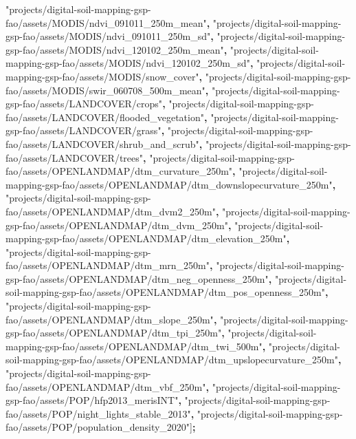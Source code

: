\documentclass[
  10pt,
  b5paper,
  oneside]{book}
\newenvironment{Shaded}{\begin{snugshade}}{\end{snugshade}}
\newcommand{\NormalTok}[1]{#1}
\newcommand{\OperatorTok}[1]{\textcolor[rgb]{0.81,0.36,0.00}{\textbf{#1}}}
\newcommand{\StringTok}[1]{\textcolor[rgb]{0.31,0.60,0.02}{#1}}
\begin{document}
\begin{Shaded}
\begin{Highlighting}[]
\StringTok{"projects/digital{-}soil{-}mapping{-}gsp{-}fao/assets/MODIS/ndvi\_091011\_250m\_mean"}\OperatorTok{,}
\StringTok{"projects/digital{-}soil{-}mapping{-}gsp{-}fao/assets/MODIS/ndvi\_091011\_250m\_sd"}\OperatorTok{,}
\StringTok{"projects/digital{-}soil{-}mapping{-}gsp{-}fao/assets/MODIS/ndvi\_120102\_250m\_mean"}\OperatorTok{,}
\StringTok{"projects/digital{-}soil{-}mapping{-}gsp{-}fao/assets/MODIS/ndvi\_120102\_250m\_sd"}\OperatorTok{,}
\StringTok{"projects/digital{-}soil{-}mapping{-}gsp{-}fao/assets/MODIS/snow\_cover"}\OperatorTok{,}
\StringTok{"projects/digital{-}soil{-}mapping{-}gsp{-}fao/assets/MODIS/swir\_060708\_500m\_mean"}\OperatorTok{,}
\StringTok{"projects/digital{-}soil{-}mapping{-}gsp{-}fao/assets/LANDCOVER/crops"}\OperatorTok{,}
\StringTok{"projects/digital{-}soil{-}mapping{-}gsp{-}fao/assets/LANDCOVER/flooded\_vegetation"}\OperatorTok{,}
\StringTok{"projects/digital{-}soil{-}mapping{-}gsp{-}fao/assets/LANDCOVER/grass"}\OperatorTok{,}
\StringTok{"projects/digital{-}soil{-}mapping{-}gsp{-}fao/assets/LANDCOVER/shrub\_and\_scrub"}\OperatorTok{,}
\StringTok{"projects/digital{-}soil{-}mapping{-}gsp{-}fao/assets/LANDCOVER/trees"}\OperatorTok{,}
\StringTok{"projects/digital{-}soil{-}mapping{-}gsp{-}fao/assets/OPENLANDMAP/dtm\_curvature\_250m"}\OperatorTok{,}
\StringTok{"projects/digital{-}soil{-}mapping{-}gsp{-}fao/assets/OPENLANDMAP/dtm\_downslopecurvature\_250m"}\OperatorTok{,}
\StringTok{"projects/digital{-}soil{-}mapping{-}gsp{-}fao/assets/OPENLANDMAP/dtm\_dvm2\_250m"}\OperatorTok{,}
\StringTok{"projects/digital{-}soil{-}mapping{-}gsp{-}fao/assets/OPENLANDMAP/dtm\_dvm\_250m"}\OperatorTok{,}
\StringTok{"projects/digital{-}soil{-}mapping{-}gsp{-}fao/assets/OPENLANDMAP/dtm\_elevation\_250m"}\OperatorTok{,}
\StringTok{"projects/digital{-}soil{-}mapping{-}gsp{-}fao/assets/OPENLANDMAP/dtm\_mrn\_250m"}\OperatorTok{,}
\StringTok{"projects/digital{-}soil{-}mapping{-}gsp{-}fao/assets/OPENLANDMAP/dtm\_neg\_openness\_250m"}\OperatorTok{,}
\StringTok{"projects/digital{-}soil{-}mapping{-}gsp{-}fao/assets/OPENLANDMAP/dtm\_pos\_openness\_250m"}\OperatorTok{,}
\StringTok{"projects/digital{-}soil{-}mapping{-}gsp{-}fao/assets/OPENLANDMAP/dtm\_slope\_250m"}\OperatorTok{,}
\StringTok{"projects/digital{-}soil{-}mapping{-}gsp{-}fao/assets/OPENLANDMAP/dtm\_tpi\_250m"}\OperatorTok{,}
\StringTok{"projects/digital{-}soil{-}mapping{-}gsp{-}fao/assets/OPENLANDMAP/dtm\_twi\_500m"}\OperatorTok{,}
\StringTok{"projects/digital{-}soil{-}mapping{-}gsp{-}fao/assets/OPENLANDMAP/dtm\_upslopecurvature\_250m"}\OperatorTok{,}
\StringTok{"projects/digital{-}soil{-}mapping{-}gsp{-}fao/assets/OPENLANDMAP/dtm\_vbf\_250m"}\OperatorTok{,}
\StringTok{"projects/digital{-}soil{-}mapping{-}gsp{-}fao/assets/POP/hfp2013\_merisINT"}\OperatorTok{,}
\StringTok{"projects/digital{-}soil{-}mapping{-}gsp{-}fao/assets/POP/night\_lights\_stable\_2013"}\OperatorTok{,}
\StringTok{"projects/digital{-}soil{-}mapping{-}gsp{-}fao/assets/POP/population\_density\_2020"}\NormalTok{]}\OperatorTok{;}


\end{Highlighting}
\end{Shaded}
\end{document}
